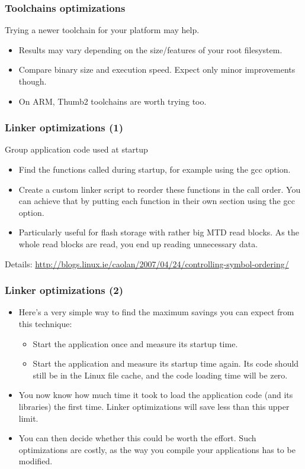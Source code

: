 \begin{frame}
\frametitle{Toolchains optimizations}
Trying a newer toolchain for your platform may help.
\begin{itemize}
  \item Results may vary depending on the size/features of your root filesystem.
  \item Compare binary size and execution speed. Expect only minor improvements
        though.
  \item On ARM, Thumb2 toolchains are worth trying too.
\end{itemize}
\end{frame}

\begin{frame}
\frametitle{Linker optimizations (1)}
Group application code used at startup
\begin{itemize}
        \item Find the functions called during startup, for example using
              the  gcc option.
        \item Create a custom linker script to reorder these functions in
              the call order. You can achieve that by putting each function
              in their own section using the  gcc
              option.
        \item Particularly useful for flash storage with rather big MTD
              read blocks. As the whole read blocks are read, you end up
              reading unnecessary data.
\end{itemize}
Details:
{\scriptsize
\url{http://blogs.linux.ie/caolan/2007/04/24/controlling-symbol-ordering/}}
\end{frame}

\begin{frame}
\frametitle{Linker optimizations (2)}
\begin{itemize}
\item Here's a very simple way to find the maximum savings you can expect
      from this technique:
      \begin{itemize}
      \item Start the application once and measure its startup time.
      \item Start the application and measure its startup time again.
            Its code should still be in the Linux file cache,
            and the code loading time will be zero.
      \end{itemize}
\item You now know how much time it took to load the application code
      (and its libraries) the first time. Linker optimizations will
      save less than this upper limit.
\item You can then decide whether this could be worth the effort.
      Such optimizations are costly, as the way you compile your
      applications has to be modified.
\end{itemize}
\end{frame}


